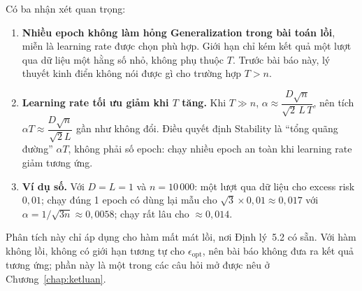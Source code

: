 Có ba nhận xét quan trọng:
\begin{enumerate}
    \item \textbf{Nhiều epoch không làm hỏng Generalization trong bài toán lồi}, miễn là learning rate được chọn phù hợp. Giới hạn chỉ kém kết quả một lượt qua dữ liệu một hằng số nhỏ, không phụ thuộc $T$. Trước bài báo này, lý thuyết kinh điển không nói được gì cho trường hợp $T > n$.
    \item \textbf{Learning rate tối ưu giảm khi $T$ tăng.} Khi $T \gg n$, $\alpha \approx \dfrac{D\sqrt{n}}{\sqrt{2}\,L\,T}$, nên tích $\alpha T \approx \dfrac{D\sqrt{n}}{\sqrt{2}L}$ gần như không đổi. Điều quyết định Stability là ``tổng quãng đường'' $\alpha T$, không phải số epoch: chạy nhiều epoch an toàn khi learning rate giảm tương ứng.
    \item \textbf{Ví dụ số.} Với $D = L = 1$ và $n = 10\,000$: một lượt qua dữ liệu cho excess risk $0{,}01$; chạy đúng 1 epoch có dùng lại mẫu cho $\sqrt{3}\times 0{,}01 \approx 0{,}017$ với $\alpha = 1/\sqrt{3n} \approx 0{,}0058$; chạy rất lâu cho $\approx 0{,}014$.
\end{enumerate}

Phân tích này chỉ áp dụng cho hàm mất mát lồi, nơi Định lý~5.2 có sẵn. Với hàm không lồi, không có giới hạn tương tự cho $\epsilon_{\mathrm{opt}}$, nên bài báo không đưa ra kết quả tương ứng; phần này là một trong các câu hỏi mở được nêu ở Chương~\ref{chap:ketluan}.
